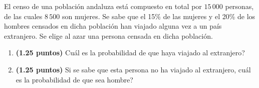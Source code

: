 
El censo de una población andaluza está compuesto en total por $15\,000$
personas, de las cuales $8\,500$ son mujeres. Se sabe que el 15\% de las
mujeres y el 20\% de los hombres censados en dicha población han viajado
alguna vez a un país extranjero. Se elige al azar una persona censada en
dicha población.
\begin{enumerate}[label=\alph*)]
  \item \textbf{(1.25 puntos)} \textquestiondown{}Cuál es la probabilidad de
  que haya viajado al extranjero?
  \item \textbf{(1.25 puntos)} Si se sabe que esta persona no ha viajado
  al extranjero, \textquestiondown{}cuál es la probabilidad de que sea hombre?
\end{enumerate}
